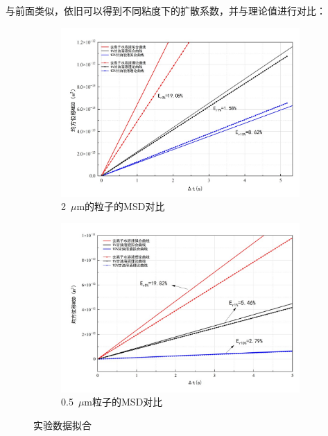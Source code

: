 \documentclass[a4paper]{report} %
\begin{document}
与前面类似，依旧可以得到不同粘度下的扩散系数，并与理论值进行对比：
\begin{figure}[H]
    \centering
    \begin{subfigure}{0.45\textwidth}
        \includegraphics[width=\linewidth]{对比2.jpg}
        \caption{2~$\mu$m的粒子的MSD对比}
        \label{fig:fitall2}
    \end{subfigure}
    \begin{subfigure}{0.45\textwidth}
        \includegraphics[width=\linewidth]{对比3.jpg}
        \caption{0.5~$\mu$m粒子的MSD对比}
        \label{fig:fitall3}
    \end{subfigure}

    \caption{实验数据拟合}
\end{figure}
\end{document}
